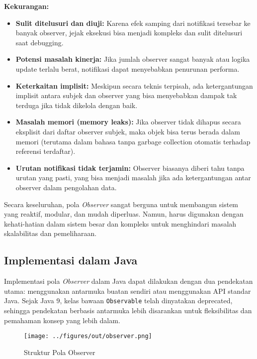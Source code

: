 \textbf{Kekurangan:}
\begin{itemize}
	\item \textbf{Sulit ditelusuri dan diuji:} Karena efek samping dari notifikasi tersebar ke banyak observer, jejak eksekusi bisa menjadi kompleks dan sulit ditelusuri saat debugging.
	
	\item \textbf{Potensi masalah kinerja:} Jika jumlah observer sangat banyak atau logika update terlalu berat, notifikasi dapat menyebabkan penurunan performa.
	
	\item \textbf{Keterkaitan implisit:} Meskipun secara teknis terpisah, ada ketergantungan implisit antara subjek dan observer yang bisa menyebabkan dampak tak terduga jika tidak dikelola dengan baik.
	
	\item \textbf{Masalah memori (memory leaks):} Jika observer tidak dihapus secara eksplisit dari daftar observer subjek, maka objek bisa terus berada dalam memori (terutama dalam bahasa tanpa garbage collection otomatis terhadap referensi terdaftar).
	
	\item \textbf{Urutan notifikasi tidak terjamin:} Observer biasanya diberi tahu tanpa urutan yang pasti, yang bisa menjadi masalah jika ada ketergantungan antar observer dalam pengolahan data.
\end{itemize}

Secara keseluruhan, pola \textit{Observer} sangat berguna untuk membangun sistem yang reaktif, modular, dan mudah diperluas. Namun, harus digunakan dengan kehati-hatian dalam sistem besar dan kompleks untuk menghindari masalah skalabilitas dan pemeliharaan.


\subsection{Implementasi dalam Java}

Implementasi pola \textit{Observer} dalam Java dapat dilakukan dengan dua pendekatan utama: menggunakan antarmuka buatan sendiri atau menggunakan API standar Java. Sejak Java 9, kelas bawaan \texttt{Observable} telah dinyatakan deprecated, sehingga pendekatan berbasis antarmuka lebih disarankan untuk fleksibilitas dan pemahaman konsep yang lebih dalam.


\begin{figure}[h]
	\centering
	\texttt{[image: ../figures/out/observer.png]}
	\caption{Struktur Pola Observer}
	\label{fig:observer}
\end{figure}

